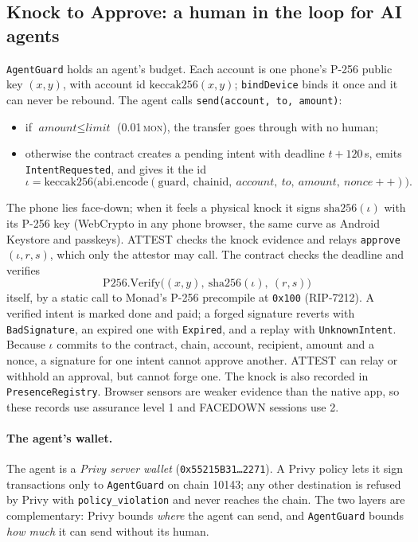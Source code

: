 \documentclass[10pt]{article}
\newcommand{\code}[1]{\texttt{\small #1}}
\newcommand{\mon}{\textsc{mon}}
\begin{document}
\subsection{Knock to Approve: a human in the loop for AI agents}\label{sec:agentguard}
\code{AgentGuard} holds an agent's budget. Each account is one phone's P-256 public key $(x,y)$, with account id
$\mathrm{keccak256}(x,y)$; \code{bindDevice} binds it once and it can never be rebound. The agent calls
\code{send(account, to, amount)}:
\begin{itemize}
\item if $\textit{amount}\le\textit{limit}$ (0.01\,\mon{}), the transfer goes through with no human;
\item otherwise the contract creates a pending intent with deadline $t+120$\,s, emits \code{IntentRequested}, and
gives it the id
\[\iota=\mathrm{keccak256}\big(\mathrm{abi.encode}(\text{guard},\ \text{chainid},\ \textit{account},\ \textit{to},\
\textit{amount},\ \textit{nonce}{+}{+})\big).\]
\end{itemize}
The phone lies face-down; when it feels a physical knock it signs $\mathrm{sha256}(\iota)$ with its P-256 key (WebCrypto
in any phone browser, the same curve as Android Keystore and passkeys). ATTEST checks the knock evidence and relays
\code{approve}$(\iota, r, s)$, which only the attestor may call. The contract checks the deadline and verifies
\[
\mathrm{P256.Verify}\big((x,y),\ \mathrm{sha256}(\iota),\ (r,s)\big)
\]
itself, by a static call to Monad's P-256 precompile at \code{0x100} (RIP-7212). A verified intent is marked done and
paid; a forged signature reverts with \code{BadSignature}, an expired one with \code{Expired}, and a replay with
\code{UnknownIntent}. Because $\iota$ commits to the contract, chain, account, recipient, amount and a nonce, a
signature for one intent cannot approve another. ATTEST can relay or withhold an approval, but cannot forge one.
The knock is also recorded in \code{PresenceRegistry}. Browser sensors are weaker evidence than the native app, so these
records use assurance level 1 and FACEDOWN sessions use 2.

\paragraph{The agent's wallet.} The agent is a \emph{Privy server wallet} (\code{0x55215B31\ldots 2271}). A Privy policy
lets it sign transactions only to \code{AgentGuard} on chain 10143; any other destination is refused by Privy with
\code{policy\_violation} and never reaches the chain. The two layers are complementary: Privy bounds \emph{where} the
agent can send, and \code{AgentGuard} bounds \emph{how much} it can send without its human.
\end{document}
